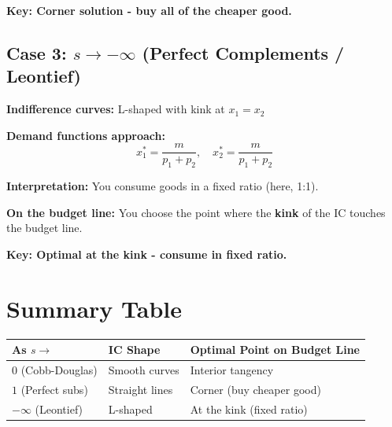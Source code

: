 \documentclass[12pt]{article}
\begin{document}
\textbf{Key: Corner solution - buy all of the cheaper good.}

\newpage

\subsection*{Case 3: $s \to -\infty$ (Perfect Complements / Leontief)}

\textbf{Indifference curves:} L-shaped with kink at $x_1 = x_2$

\textbf{Demand functions approach:}
$$x_1^* = \frac{m}{p_1 + p_2}, \quad x_2^* = \frac{m}{p_1 + p_2}$$

\textbf{Interpretation:} You consume goods in a fixed ratio (here, 1:1).

\textbf{On the budget line:} You choose the point where the \textbf{kink} of the IC touches the budget line.

\begin{center}
\end{center}

\textbf{Key: Optimal at the kink - consume in fixed ratio.}

\section*{Summary Table}

\begin{center}
\begin{tabular}{|l|l|l|}
\hline
\textbf{As $s \to$} & \textbf{IC Shape} & \textbf{Optimal Point on Budget Line} \\
\hline
$0$ (Cobb-Douglas) & Smooth curves & Interior tangency \\
\hline
$1$ (Perfect subs) & Straight lines & Corner (buy cheaper good) \\
\hline
$-\infty$ (Leontief) & L-shaped & At the kink (fixed ratio) \\
\hline
\end{tabular}
\end{center}
\end{document}
